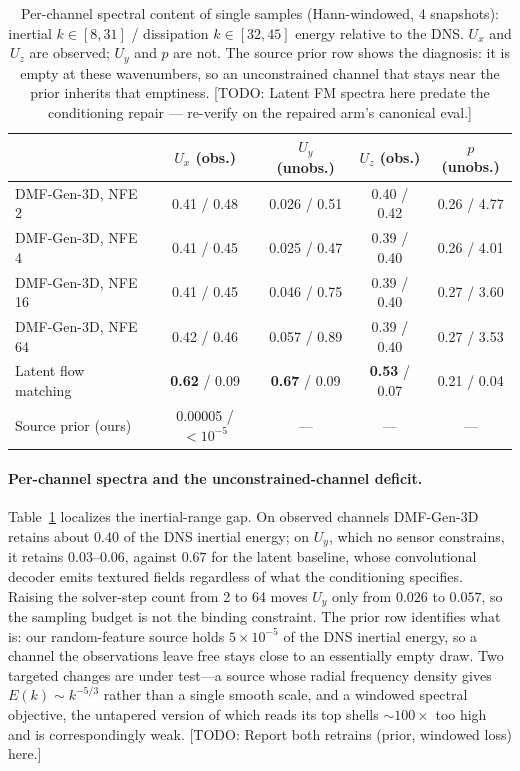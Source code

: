 \documentclass{article} %
\newcommand{\todo}[1]{{\color{red}[TODO: #1]}}
\newcommand{\model}{DMF-Gen-3D}
\begin{document}
\begin{table}[h]
\caption{Per-channel spectral content of single samples (Hann-windowed, 4 snapshots): inertial $k\in[8,31]$ / dissipation $k\in[32,45]$ energy relative to the DNS. $U_x$ and $U_z$ are observed; $U_y$ and $p$ are not. The source prior row shows the diagnosis: it is empty at these wavenumbers, so an unconstrained channel that stays near the prior inherits that emptiness. \todo{Latent FM spectra here predate the conditioning repair --- re-verify on the repaired arm's canonical eval.}}
\label{tab:perchannel}
\begin{center}
\footnotesize
\setlength{\tabcolsep}{5pt}
\begin{tabular}{lcccc}
\toprule
& $U_x$ (obs.) & $U_y$ (unobs.) & $U_z$ (obs.) & $p$ (unobs.) \\
\midrule
\model{}, NFE 2 & 0.41 / 0.48 & 0.026 / 0.51 & 0.40 / 0.42 & 0.26 / 4.77 \\
\model{}, NFE 4 & 0.41 / 0.45 & 0.025 / 0.47 & 0.39 / 0.40 & 0.26 / 4.01 \\
\model{}, NFE 16 & 0.41 / 0.45 & 0.046 / 0.75 & 0.39 / 0.40 & 0.27 / 3.60 \\
\model{}, NFE 64 & 0.42 / 0.46 & 0.057 / 0.89 & 0.39 / 0.40 & 0.27 / 3.53 \\
Latent flow matching & \textbf{0.62} / 0.09 & \textbf{0.67} / 0.09 & \textbf{0.53} / 0.07 & 0.21 / 0.04 \\
\midrule
Source prior (ours) & 0.00005 / $<10^{-5}$ & --- & --- & --- \\
\bottomrule
\end{tabular}
\end{center}
\end{table}

\paragraph{Per-channel spectra and the unconstrained-channel deficit.} Table~\ref{tab:perchannel} localizes the inertial-range gap. On observed channels \model{} retains about $0.40$ of the DNS inertial energy; on $U_y$, which no sensor constrains, it retains $0.03$--$0.06$, against $0.67$ for the latent baseline, whose convolutional decoder emits textured fields regardless of what the conditioning specifies. Raising the solver-step count from 2 to 64 moves $U_y$ only from $0.026$ to $0.057$, so the sampling budget is not the binding constraint. The prior row identifies what is: our random-feature source holds $5\times10^{-5}$ of the DNS inertial energy, so a channel the observations leave free stays close to an essentially empty draw. Two targeted changes are under test---a source whose radial frequency density gives $E(k)\sim k^{-5/3}$ rather than a single smooth scale, and a windowed spectral objective, the untapered version of which reads its top shells $\sim$$100\times$ too high and is correspondingly weak. \todo{Report both retrains (prior, windowed loss) here.}
\end{document}

